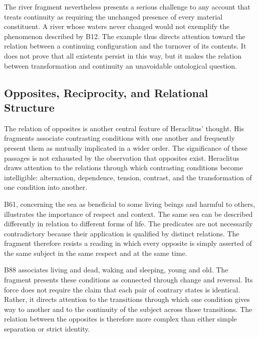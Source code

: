 \label{para:VS.B01.P01.C08.S03.SS03.P006}

The river fragment nevertheless presents a serious
challenge to any account that treats continuity as
requiring the unchanged presence of every material
constituent. A river whose waters never changed would
not exemplify the phenomenon described by B12. The
example thus directs attention toward the relation
between a continuing configuration and the turnover
of its contents. It does not prove that all existents
persist in this way, but it makes the relation between
transformation and continuity an unavoidable ontological
question.


\subsection{Opposites, Reciprocity, and Relational Structure}

\label{para:VS.B01.P01.C08.S03.SS04.P001}

The relation of opposites is another central feature
of Heraclitus' thought. His fragments associate
contrasting conditions with one another and frequently
present them as mutually implicated in a wider order.
The significance of these passages is not exhausted
by the observation that opposites exist. Heraclitus
draws attention to the relations through which
contrasting conditions become intelligible: alternation,
dependence, tension, contrast, and the transformation
of one condition into another.

\label{para:VS.B01.P01.C08.S03.SS04.P002}

B61, concerning the sea as beneficial to some living
beings and harmful to others, illustrates the importance
of respect and context. The same sea can be described
differently in relation to different forms of life.
The predicates are not necessarily contradictory
because their application is qualified by distinct
relations. The fragment therefore resists a reading
in which every opposite is simply asserted of the
same subject in the same respect and at the same time.

\label{para:VS.B01.P01.C08.S03.SS04.P003}

B88 associates living and dead, waking and sleeping,
young and old. The fragment presents these conditions
as connected through change and reversal. Its force
does not require the claim that each pair of contrary
states is identical. Rather, it directs attention to
the transitions through which one condition gives
way to another and to the continuity of the subject
across those transitions. The relation between the
opposites is therefore more complex than either
simple separation or strict identity.

